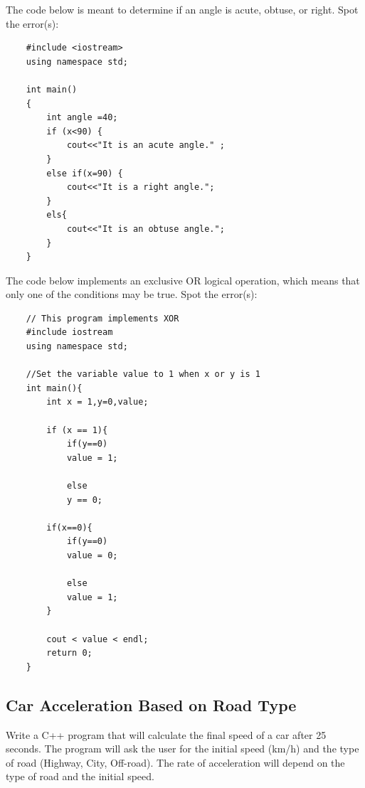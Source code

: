 \begin{multipart}
    The code below is meant to determine if an angle is acute, obtuse, or right. Spot the error(s):
    \begin{verbatim}
    #include <iostream>
    using namespace std;
    
    int main()
    {
        int angle =40;
        if (x<90) { 
            cout<<"It is an acute angle." ;
        }
        else if(x=90) {
            cout<<"It is a right angle.";
        }
        els{
            cout<<"It is an obtuse angle.";
        }
    }
    \end{verbatim}
\end{multipart}

\begin{multipart}
    The code below implements an exclusive OR logical operation, which means that only one of the conditions may be true. Spot the error(s):
    \begin{verbatim}
    // This program implements XOR
    #include iostream
    using namespace std;
    
    //Set the variable value to 1 when x or y is 1
    int main(){
        int x = 1,y=0,value;
        
        if (x == 1){ 
            if(y==0)
            value = 1; 
    
            else
            y == 0; 
         
        if(x==0){ 
            if(y==0)
            value = 0; 
    
            else
            value = 1;
        }
        
        cout < value < endl;
        return 0;
    }
    \end{verbatim}
\end{multipart}

\subsection{Car Acceleration Based on Road Type}

Write a C++ program that will calculate the final speed of a car after 25 seconds. The program will ask the user for the initial speed (km/h) and the type of road (Highway, City, Off-road). The rate of acceleration will depend on the type of road and the initial speed.

